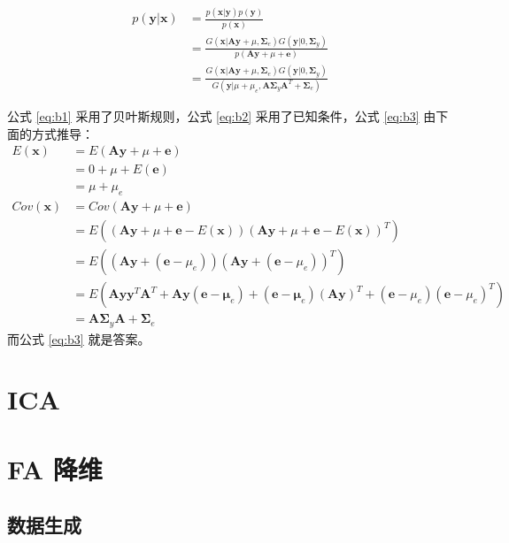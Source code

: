     \begin{align}
        p(\mathbf{y}|\mathbf{x}) &= \frac{p(\mathbf{x}|\mathbf{y})p(\mathbf{y})}{p(\mathbf{x})} \label{eq:b1} \\
        &= \frac{G(\mathbf{x}|\mathbf{A}\mathbf{y}+\mu,\mathbf{\Sigma}_e)G(\mathbf{y}|0,\mathbf{\Sigma}_y)}{p(\mathbf{A}\mathbf{y}+\mu+\mathbf{e})} \label{eq:b2} \\
        &= \frac{G(\mathbf{x}|\mathbf{A}\mathbf{y}+\mu,\mathbf{\Sigma}_e)G(\mathbf{y}|0,\mathbf{\Sigma}_y)}{G(\mathbf{y}|\mu+\mu_e,\mathbf{A}\mathbf{\Sigma}_y\mathbf{A}^T+\mathbf{\Sigma}_e)} \label{eq:b3}
    \end{align}

    公式 \eqref{eq:b1} 采用了贝叶斯规则，公式 \eqref{eq:b2} 采用了已知条件，公式 \eqref{eq:b3} 由下面的方式推导：
    \begin{align*}
        E(\mathbf{x}) &= E(\mathbf{A}\mathbf{y}+\mu+\mathbf{e}) \\
        &= 0 + \mu + E(\mathbf{e}) \\
        &= \mu + \mu_e\\
        Cov(\mathbf{x}) &= Cov(\mathbf{A}\mathbf{y}+\mu+\mathbf{e}) 
        \\
        &= E((\mathbf{A}\mathbf{y}+\mu+\mathbf{e}-E(\mathbf{x}))(\mathbf{A}\mathbf{y}+\mu+\mathbf{e}-E(\mathbf{x}))^T) \\
        &= E((\mathbf{A}\mathbf{y} + (\mathbf{e}-\mu_e))(\mathbf{A}\mathbf{y} + (\mathbf{e}-\mu_e))^T)\\
        &= E(\mathbf{A}\mathbf{y}\mathbf{y}^T\mathbf{A}^T+\mathbf{A}\mathbf{y}(\mathbf{e}-\mathbf{\mu}_e)+(\mathbf{e}-\mathbf{\mu}_e)(\mathbf{Ay})^T+(\mathbf{e}-\mu_e)(\mathbf{e}-\mu_e)^T)\\
        &= \mathbf{A}\mathbf{\Sigma}_y\mathbf{A} + \mathbf{\Sigma}_e
    \end{align*}
    而公式 \eqref{eq:b3} 就是答案。

    \section{ICA}

    
    
    \section{FA 降维}

    \subsection{数据生成}

